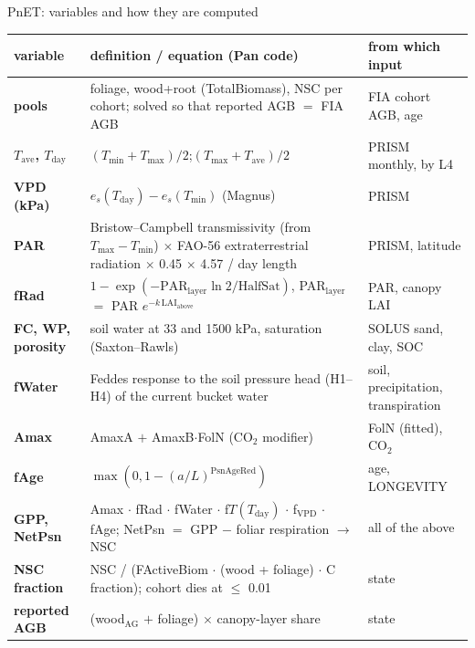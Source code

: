 \begin{frame}{PnET: variables and how they are computed}
\scriptsize
\renewcommand{\arraystretch}{1.07}
\begin{tabularx}{\textwidth}{@{}>{\bfseries}p{2.3cm}X>{\raggedright\arraybackslash}p{3.9cm}@{}}
\toprule
variable & definition / equation (Pan code) & from which input \\
\midrule
pools & foliage, wood+root (TotalBiomass), NSC per cohort; solved so that reported AGB $=$ FIA AGB & FIA cohort AGB, age \\
$T_{\text{ave}}$, $T_{\text{day}}$ & $(T_{\min}+T_{\max})/2$;\quad $(T_{\max}+T_{\text{ave}})/2$ & PRISM monthly, by L4 \\
VPD (kPa) & $e_s(T_{\text{day}})-e_s(T_{\min})$ (Magnus) & PRISM \\
PAR & Bristow–Campbell transmissivity (from $T_{\max}-T_{\min}$) $\times$ FAO-56 extraterrestrial radiation $\times$ 0.45 $\times$ 4.57 / day length & PRISM, latitude \\
fRad & $1-\exp(-\text{PAR}_{\text{layer}}\ln2/\text{HalfSat})$, PAR$_{\text{layer}}$ $=$ PAR $e^{-k\,\text{LAI}_{\text{above}}}$ & PAR, canopy LAI \\
FC, WP, porosity & soil water at 33 and 1500 kPa, saturation (Saxton–Rawls) & SOLUS sand, clay, SOC \\
fWater & Feddes response to the soil pressure head (H1–H4) of the current bucket water & soil, precipitation, transpiration \\
Amax & AmaxA $+$ AmaxB$\cdot$FolN (CO$_2$ modifier) & FolN (fitted), CO$_2$ \\
fAge & $\max(0,1-(a/L)^{\text{PsnAgeRed}})$ & age, LONGEVITY \\
GPP, NetPsn & Amax $\cdot$ fRad $\cdot$ fWater $\cdot$ f$T(T_{\text{day}})$ $\cdot$ f$_{\text{VPD}}$ $\cdot$ fAge; NetPsn $=$ GPP $-$ foliar respiration $\rightarrow$ NSC & all of the above \\
NSC fraction & NSC / (FActiveBiom $\cdot$ (wood + foliage) $\cdot$ C fraction); cohort dies at $\le$ 0.01 & state \\
reported AGB & (wood$_{\text{AG}}$ $+$ foliage) $\times$ canopy-layer share & state \\
\bottomrule
\end{tabularx}
\end{frame}
